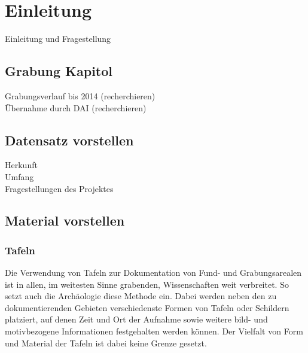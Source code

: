 \section{Einleitung}

Einleitung und Fragestellung\\
\cite{houghpatent}

\subsection{Grabung Kapitol}
Grabungsverlauf bis 2014 (recherchieren)\\
Übernahme durch DAI (recherchieren)\\

\subsection{Datensatz vorstellen}
Herkunft\\
Umfang\\
Fragestellungen des Projektes\\

\subsection{Material vorstellen}

\subsubsection{Tafeln}
Die Verwendung von Tafeln zur Dokumentation von Fund- und Grabungsarealen ist in allen, im weitesten Sinne grabenden, Wissenschaften weit verbreitet. So setzt auch die Archäologie diese Methode ein. Dabei werden neben den zu dokumentierenden Gebieten verschiedenste Formen von Tafeln oder Schildern platziert, auf denen Zeit und Ort der Aufnahme sowie weitere bild- und motivbezogene Informationen festgehalten werden können. Der Vielfalt von Form und Material der Tafeln ist dabei keine Grenze gesetzt.


